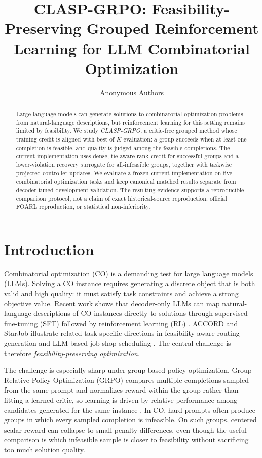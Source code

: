 \documentclass{article}
\title{CLASP-GRPO: Feasibility-Preserving Grouped Reinforcement Learning for LLM Combinatorial Optimization}
\author{Anonymous Authors}
\theoremstyle{remark}
\begin{document}
\maketitle

\begin{abstract}
Large language models can generate solutions to combinatorial optimization problems from natural-language descriptions, but reinforcement learning for this setting remains limited by feasibility. We study \emph{CLASP-GRPO}, a critic-free grouped method whose training credit is aligned with best-of-\(K\) evaluation: a group succeeds when at least one completion is feasible, and quality is judged among the feasible completions. The current implementation uses dense, tie-aware rank credit for successful groups and a lower-violation recovery surrogate for all-infeasible groups, together with taskwise projected controller updates. We evaluate a frozen current implementation on five combinatorial optimization tasks and keep canonical matched results separate from decoder-tuned development validation. The resulting evidence supports a reproducible comparison protocol, not a claim of exact historical-source reproduction, official FOARL reproduction, or statistical non-inferiority.
\end{abstract}

\section{Introduction}
Combinatorial optimization (CO) is a demanding test for large language models (LLMs). Solving a CO instance requires generating a discrete object that is both valid and high quality: it must satisfy task constraints and achieve a strong objective value. Recent work shows that decoder-only LLMs can map natural-language descriptions of CO instances directly to solutions through supervised fine-tuning (SFT) followed by reinforcement learning (RL) \citep{jiang2025endtoendco}. ACCORD and StarJob illustrate related task-specific directions in feasibility-aware routing generation and LLM-based job shop scheduling \citep{abgaryan2025accord, abgaryan2025starjob}. The central challenge is therefore \emph{feasibility-preserving optimization}.

The challenge is especially sharp under group-based policy optimization. Group Relative Policy Optimization (GRPO) compares multiple completions sampled from the same prompt and normalizes reward within the group rather than fitting a learned critic, so learning is driven by relative performance among candidates generated for the same instance \citep{shao2024deepseekmath, mroueh2025rlvr}. In CO, hard prompts often produce groups in which every sampled completion is infeasible. On such groups, centered scalar reward can collapse to small penalty differences, even though the useful comparison is which infeasible sample is closer to feasibility without sacrificing too much solution quality.
\end{document}
